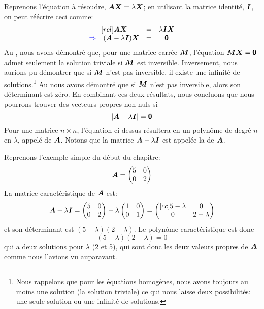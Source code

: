 Reprenons l'équation à résoudre, $\boldsymbol{A}\boldsymbol{X} = \lambda\boldsymbol{X}$; en utilisant la matrice identité, $\boldsymbol{I}$, on peut
réécrire ceci comme:
\[
\begin{matrix}[rcl]
\boldsymbol{A}\boldsymbol{X} &=& \lambda\boldsymbol{I}\boldsymbol{X} \\
{\color{blue} \Rightarrow\quad}(\boldsymbol{A} - \lambda\boldsymbol{I}) \boldsymbol{X} &=& \mbox{\textsf{\textbf{{0}}}}
\end{matrix}
\]
Au , nous avons démontré que, pour une matrice carrée $\boldsymbol{M}$, 
l'équation $\boldsymbol{M}\boldsymbol{X} = \mbox{\textsf{\textbf{{0}}}}$ admet seulement la solution
triviale si $\boldsymbol{M}$ est inversible. 
Inversement, nous aurions pu démontrer que si $\boldsymbol{M}$ n'est pas inversible,
il existe une infinité de solutions.\footnote{Nous rappelons que pour les équations homogènes, nous avons toujours au moins une solution (la solution triviale) ce qui nous laisse deux possibilités: une seule solution ou une infinité de solutions.}  
Au  nous avons démontré que si $\boldsymbol{M}$ n'est pas inversible, alors son déterminant est zéro. 
En combinant ces deux résultats, nous concluons que nous pourrons trouver des vecteurs propres non-nuls si
\[
|\boldsymbol{A} - \lambda\boldsymbol{I}| = \mbox{\textsf{\textbf{{0}}}}
\]
Pour une matrice $n\times n$, l'équation ci-dessus résultera en un polynôme de degré $n$ en $\lambda$, appelé
 de $\boldsymbol{A}$.  Notons que la matrice $\boldsymbol{A} - \lambda\boldsymbol{I}$ est appelée la
 de $\boldsymbol{A}$.
\begin{exemple}
Reprenons l'exemple simple du début du chapitre:
\[
\boldsymbol{A} = \begin{pmatrix}
5 & 0 \\ 0 & 2
\end{pmatrix}
\]
La matrice caractéristique de $\boldsymbol{A}$ est:
\[
\boldsymbol{A} - \lambda\boldsymbol{I} = \begin{pmatrix}
5 & 0 \\0 & 2
\end{pmatrix} - \lambda\begin{pmatrix}
1 & 0 \\ 0 & 1
\end{pmatrix}
=
\begin{pmatrix}[cc]
5-\lambda & 0 \\ 0 & 2-\lambda
\end{pmatrix}
\]
et son déterminant est $(5-\lambda)(2-\lambda)$.  Le polynôme caractéristique est donc
\[
(5-\lambda)(2-\lambda) = 0
\]
qui a deux solutions pour $\lambda$ (2 et 5), qui sont donc les deux valeurs propres de $\boldsymbol{A}$ comme
nous l'avions vu auparavant.
\end{exemple}
